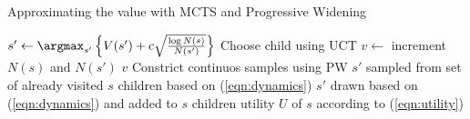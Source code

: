 %

\begin{algorithm}
\caption{Approximating the value with MCTS and Progressive Widening}
\label{algo:mcvts}
  \begin{algorithmic}[1]
    \State $s' \gets \argmax_{s'} \left\{V(s') + c \sqrt{\frac{\log N(s)}{N(s')}} \right\}$
      \Comment Choose child using UCT
      \State $v \gets $
      \State increment $N(s)$ and $N(s')$
      \State \Return $v$
	  \Comment Constrict continuos samples using PW
        \State $s'$ sampled from set of already visited $s$ children based on (\ref{eqn:dynamics})
	  \Else
        \State $s'$ drawn based on (\ref{eqn:dynamics}) and added to $s$ children
	  \EndIf
      \State \Return {}
    \State \Return utility $U$ of $s$ according to (\ref{eqn:utility})
    \EndIf
    \EndFunction{}
  \end{algorithmic}
\end{algorithm}


